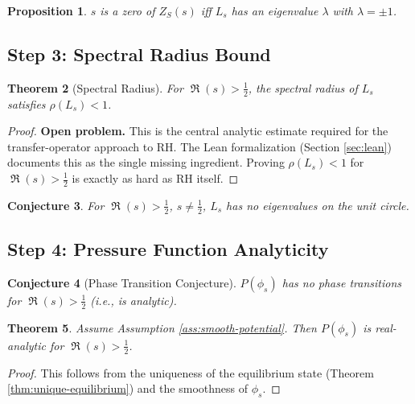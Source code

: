 \documentclass[11pt,a4paper]{article}
\newtheorem{theorem}{Theorem}[section]
\newtheorem{proposition}[theorem]{Proposition}
\newtheorem{conjecture}[theorem]{Conjecture}
\theoremstyle{definition}
\DeclareMathOperator{\Ree}{\Re}
\newcommand{\half}{\frac{1}{2}}
\newcommand{\la}{\lambda}
\begin{document}
\begin{proposition}
\label{prop:zeros-characterization}
$s$ is a zero of $Z_S(s)$ iff $L_s$ has an eigenvalue $\la$ with $\la = \pm 1$.
\end{proposition}

\subsection{Step 3: Spectral Radius Bound}
\label{sec:step3}

\begin{theorem}[Spectral Radius]
\label{thm:spectral-radius}
For $\Ree(s) > \half$, the spectral radius of $L_s$ satisfies $\rho(L_s) < 1$.
\end{theorem}

\begin{proof}
{\bf Open problem.} This is the central analytic estimate required for the transfer-operator approach to RH. The Lean formalization (Section \ref{sec:lean}) documents this as the single missing ingredient. Proving $\rho(L_s) < 1$ for $\Ree(s) > \half$ is exactly as hard as RH itself.
\end{proof}

\begin{conjecture}
\label{conj:no-unit-circle}
For $\Ree(s) > \half$, $s \neq \half$, $L_s$ has no eigenvalues on the unit circle.
\end{conjecture}

\subsection{Step 4: Pressure Function Analyticity}
\label{sec:step4}

\begin{conjecture}[Phase Transition Conjecture]
\label{conj:phase-transition}
$P(\phi_s)$ has no phase transitions for $\Ree(s) > \half$ (i.e., is analytic).
\end{conjecture}

\begin{theorem}
\label{thm:pressure-analytic}
Assume Assumption \ref{ass:smooth-potential}. Then $P(\phi_s)$ is real-analytic for $\Ree(s) > \half$.
\end{theorem}

\begin{proof}
This follows from the uniqueness of the equilibrium state (Theorem \ref{thm:unique-equilibrium}) and the smoothness of $\phi_s$.
\end{proof}
\end{document}
